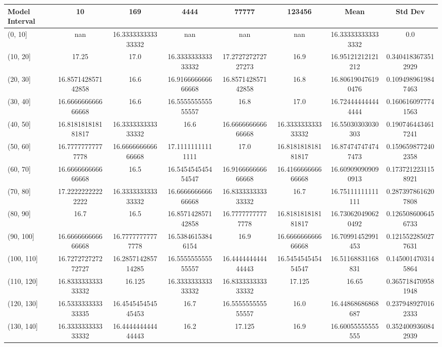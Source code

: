 \begin{table}[H]
\centering
\begin{tabular}{|l |c |c |c |c |c |c |c|}
\hline
Model Interval & 10 & 169 & 4444 & 77777 & 123456 & Mean & Std Dev \\
\hline
(0, 10] & nan & 16.333333333333332 & nan & nan & nan & 16.333333333333332 & 0.0 \\
(10, 20] & 17.25 & 17.0 & 16.333333333333332 & 17.272727272727273 & 16.9 & 16.95121212121212 & 0.3404183673512929 \\
(20, 30] & 16.857142857142858 & 16.6 & 16.916666666666668 & 16.857142857142858 & 16.8 & 16.806190476190476 & 0.1094989619847463 \\
(30, 40] & 16.666666666666668 & 16.6 & 16.555555555555557 & 16.8 & 17.0 & 16.724444444444444 & 0.1606160977741563 \\
(40, 50] & 16.818181818181817 & 16.333333333333332 & 16.6 & 16.666666666666668 & 16.333333333333332 & 16.55030303030303 & 0.1907464434617241 \\
(50, 60] & 16.77777777777778 & 16.666666666666668 & 17.11111111111111 & 17.0 & 16.818181818181817 & 16.874747474747473 & 0.1596598772402358 \\
(60, 70] & 16.666666666666668 & 16.5 & 16.545454545454547 & 16.916666666666668 & 16.416666666666668 & 16.609090909090913 & 0.1737212231158921 \\
(70, 80] & 17.22222222222222 & 16.333333333333332 & 16.666666666666668 & 16.833333333333332 & 16.7 & 16.75111111111111 & 0.2873978616207808 \\
(80, 90] & 16.7 & 16.5 & 16.857142857142858 & 16.77777777777778 & 16.818181818181817 & 16.730620490620492 & 0.1265086006456733 \\
(90, 100] & 16.666666666666668 & 16.77777777777778 & 16.53846153846154 & 16.9 & 16.666666666666668 & 16.70991452991453 & 0.1215522850277631 \\
(100, 110] & 16.727272727272727 & 16.285714285714285 & 16.555555555555557 & 16.444444444444443 & 16.545454545454547 & 16.51168831168831 & 0.1450014703145864 \\
(110, 120] & 16.833333333333332 & 16.125 & 16.333333333333332 & 16.833333333333332 & 17.125 & 16.65 & 0.3657184709581948 \\
(120, 130] & 16.533333333333335 & 16.454545454545453 & 16.7 & 16.555555555555557 & 16.0 & 16.44868686868687 & 0.2379489270162333 \\
(130, 140] & 16.333333333333332 & 16.444444444444443 & 16.2 & 17.125 & 16.9 & 16.60055555555555 & 0.3524009360842939 \\

\end{tabular}
\end{table}
